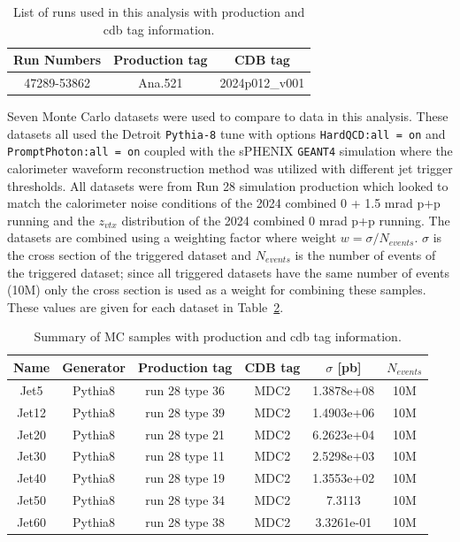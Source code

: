 \begin{table}[ht]
\centering
\begin{tabular}{|c|cc|}
\hline
Run Numbers & Production tag & CDB tag  \\ \hline
47289-53862 & Ana.521 & 2024p012\_v001 \\ \hline
\end{tabular}
\caption{List of runs used in this analysis with production and cdb tag information.}
\label{table:Run2023dataset}
\end{table}

Seven Monte Carlo datasets were used to compare to data in this analysis. These datasets all used the Detroit \verb|Pythia-8| tune with options \verb|HardQCD:all = on| and \verb|PromptPhoton:all = on| coupled with the sPHENIX \verb|GEANT4| simulation where the calorimeter waveform reconstruction method was utilized with different jet trigger thresholds. All datasets were from Run 28 simulation production which looked to match the calorimeter noise conditions of the 2024 combined 0 + 1.5 mrad p+p running and the $z_{vtx}$ distribution of the 2024 combined 0 mrad p+p running. The datasets are combined using a weighting factor where weight $w = \sigma/N_{events}$. $\sigma$ is the cross section of the triggered dataset and $N_{events}$ is the number of events of the triggered dataset; since all triggered datasets have the same number of events (10M) only the cross section is used as a weight for combining these samples. These values are given for each dataset in Table~\ref{table:MCdataset}.

\begin{table}[ht]    
\centering
\begin{tabular}{|c|ccccc|}
\hline
Name  & Generator & Production tag & CDB tag & $\sigma$ [pb] & $N_{events}$ \\ \hline
Jet5  & Pythia8   & run 28 type 36 & MDC2    & 1.3878e+08 & 10M   \\ \hline
Jet12 & Pythia8   & run 28 type 39 & MDC2    & 1.4903e+06 & 10M   \\ \hline
Jet20 & Pythia8   & run 28 type 21 & MDC2    & 6.2623e+04 & 10M   \\ \hline
Jet30 & Pythia8   & run 28 type 11 & MDC2    & 2.5298e+03 & 10M   \\ \hline
Jet40 & Pythia8   & run 28 type 19 & MDC2    & 1.3553e+02 & 10M   \\ \hline
Jet50 & Pythia8   & run 28 type 34 & MDC2    & 7.3113     & 10M   \\ \hline
Jet60 & Pythia8   & run 28 type 38 & MDC2    & 3.3261e-01 & 10M   \\ \hline

\end{tabular}
\caption{Summary of MC samples with production and cdb tag information.}
\label{table:MCdataset}
\end{table}

